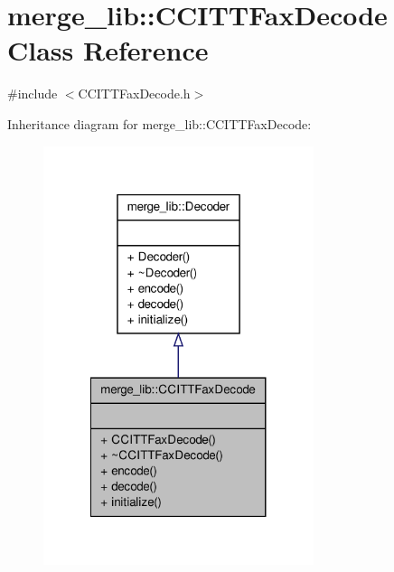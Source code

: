 \hypertarget{classmerge__lib_1_1_c_c_i_t_t_fax_decode}{\section{merge\-\_\-lib\-:\-:C\-C\-I\-T\-T\-Fax\-Decode Class Reference}
\label{de/d74/classmerge__lib_1_1_c_c_i_t_t_fax_decode}
}


{\ttfamily \#include $<$C\-C\-I\-T\-T\-Fax\-Decode.\-h$>$}



Inheritance diagram for merge\-\_\-lib\-:\-:C\-C\-I\-T\-T\-Fax\-Decode\-:
\nopagebreak
\begin{figure}[H]
\begin{center}
\leavevmode
\includegraphics[width=224pt]{da/dfb/classmerge__lib_1_1_c_c_i_t_t_fax_decode__inherit__graph}
\end{center}
\end{figure}


